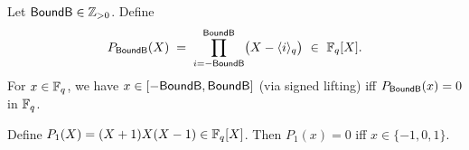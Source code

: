 \begin{definition}\label{def:vanish-bound}
Let \(\mathsf{BoundB}\in\mathbb{Z}_{>0}\). Define
\[
  P_{\BoundB}(X) \;=\; \prod_{i=-\BoundB}^{\BoundB}\bigl(X-\langle i\rangle_q\bigr)\ \in\ \Fq[X].
\]
For \(x\in\mathbb{F}_q\), we have \(x\in[-\mathsf{BoundB},\mathsf{BoundB}]\) (via signed lifting) iff \(P_{\mathsf{BoundB}}(x)=0\) in \(\mathbb{F}_q\).
\end{definition}

\begin{definition}\label{def:vanish-carry}
Define \(P_{1}(X)=(X+1)X(X-1)\in\mathbb{F}_q[X]\). Then \(P_1(x)=0\) iff \(x\in\{-1,0,1\}\).
\end{definition}
